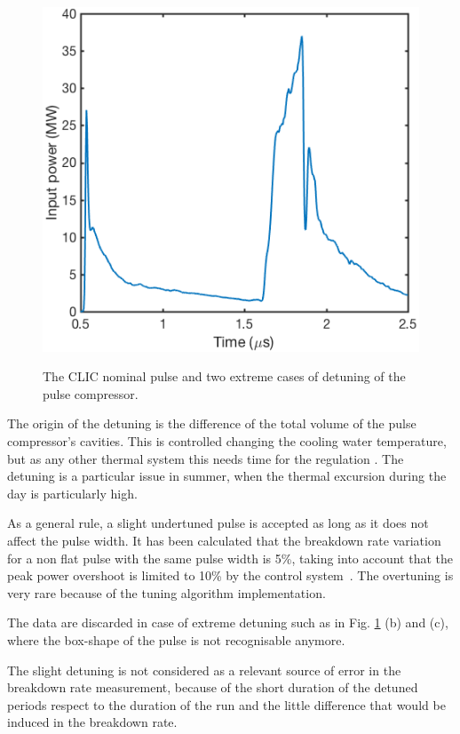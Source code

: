 \begin{figure}[h]
   {\includegraphics[scale=0.41]{pictures/Overtuning.png}}
\caption{The CLIC nominal pulse and two extreme cases of detuning of the pulse compressor.}
 \label{detuning_fig}
 \end{figure}


The origin of the detuning is the difference of the total volume of the pulse compressor's cavities. This is controlled changing the cooling water temperature, but as any other thermal system this needs time for the regulation \cite{Woolley:CWS2016}. The detuning is a particular issue in summer, when the thermal excursion during the day is particularly high.

As a general rule, a slight undertuned pulse is accepted as long as it does not affect the pulse width. It has been calculated that the breakdown rate variation for a non flat pulse with the same pulse width is 5\%, taking into account that the peak power overshoot is limited to 10\% by the control system~\cite{Frank:PC}.  The overtuning is very rare because of the tuning algorithm implementation.

The data are discarded in case of extreme detuning such as in Fig. \ref{detuning_fig} (b) and (c), where the box-shape of the pulse is not recognisable anymore.

The slight detuning is not considered as a relevant source of error in the breakdown rate measurement,  because of the short duration of the detuned periods respect to the duration of the run and the little difference that would be induced in the breakdown rate.



